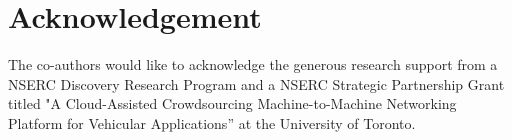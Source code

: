 \section{Acknowledgement}

The co-authors would like to acknowledge the generous research support from a NSERC Discovery Research Program and a NSERC Strategic Partnership Grant titled "A Cloud-Assisted Crowdsourcing Machine-to-Machine Networking Platform for Vehicular Applications” at the University of Toronto.